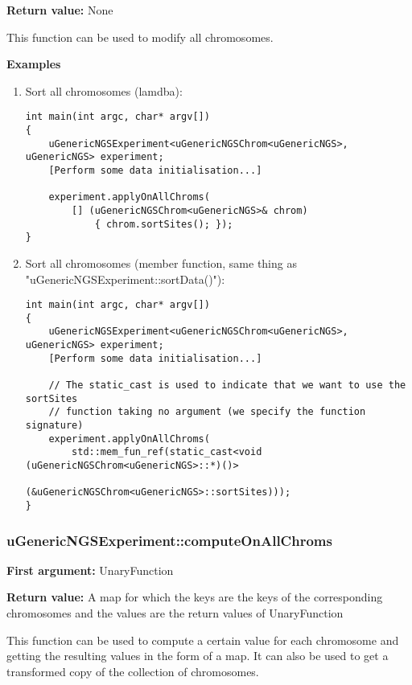 \documentclass[letterpaper,10pt]{article}
\begin{document}
\noindent{}\textbf{Return value:} None

\bigskip
\noindent{}This function can be used to modify all chromosomes.

\bigskip
\noindent{}\textbf{Examples}
\begin{enumerate}
 \item Sort all chromosomes (lamdba):
\begin{verbatim}
int main(int argc, char* argv[])
{
    uGenericNGSExperiment<uGenericNGSChrom<uGenericNGS>, uGenericNGS> experiment;
    [Perform some data initialisation...]

    experiment.applyOnAllChroms(
        [] (uGenericNGSChrom<uGenericNGS>& chrom) 
            { chrom.sortSites(); });
}
\end{verbatim}

\item Sort all chromosomes (member function, same thing as "uGenericNGSExperiment::sortData()"):
\begin{verbatim}
int main(int argc, char* argv[])
{
    uGenericNGSExperiment<uGenericNGSChrom<uGenericNGS>, uGenericNGS> experiment;
    [Perform some data initialisation...]

    // The static_cast is used to indicate that we want to use the sortSites
    // function taking no argument (we specify the function signature)
    experiment.applyOnAllChroms(
        std::mem_fun_ref(static_cast<void (uGenericNGSChrom<uGenericNGS>::*)()>
                         (&uGenericNGSChrom<uGenericNGS>::sortSites)));
}
\end{verbatim}
\end{enumerate}

\subsubsection{uGenericNGSExperiment::computeOnAllChroms}
\textbf{First argument:} UnaryFunction

\noindent{}\textbf{Return value:} A map for which the keys are the keys of the corresponding chromosomes and the values are the return values of UnaryFunction

\bigskip
\noindent{}This function can be used to compute a certain value for each chromosome and getting the resulting values in the form
of a map. It can also be used to get a transformed copy of the collection of chromosomes.
\end{document}
